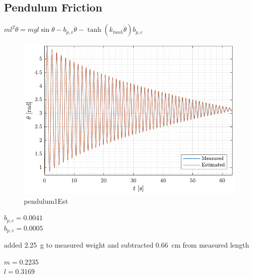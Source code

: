 \subsection{Pendulum Friction}

$m l ^2 \ddot{\theta} = m g l  \sin \theta - b_{p,v} \dot{\theta} - \tanh(k_{tanh} \dot{\theta}) b_{p,c} $

\begin{figure}[H]
  \includegraphics[width=.7\textwidth]{figures/pendulum1Est}
  \caption{pendulum1Est}
  \label{fig:pendulum1Est}
\end{figure}

$ b_{p,c} = 0.0041 $ \\
$ b_{p,v} = 0.0005 $

added \SI{2.25}{g} to measured weight and subtracted \SI{0.66}{cm} from measured length

$ m = 0.2235 $ \\
$ l = 0.3169 $

